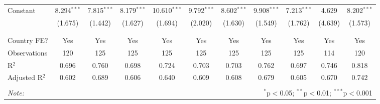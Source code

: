 \begin{table}[!htbp]
\begin{tabular}{@{\extracolsep{5pt}}lcccccccccc}
 Constant & 8.294$^{***}$ & 7.815$^{***}$ & 8.179$^{***}$ & 10.610$^{***}$ & 9.792$^{***}$ & 8.602$^{***}$ & 9.908$^{***}$ & 7.213$^{***}$ & 4.629 & 8.202$^{***}$ \\ 
  & (1.675) & (1.442) & (1.627) & (1.694) & (2.020) & (1.630) & (1.549) & (1.762) & (4.639) & (1.573) \\ 
  & & & & & & & & & & \\ 
\hline \\[-1.8ex] 
Country FE? & Yes & Yes & Yes & Yes & Yes & Yes & Yes & Yes & Yes & Yes \\ 
Observations & 120 & 125 & 125 & 125 & 125 & 125 & 125 & 125 & 114 & 120 \\ 
R$^{2}$ & 0.696 & 0.760 & 0.698 & 0.724 & 0.703 & 0.703 & 0.762 & 0.697 & 0.746 & 0.818 \\ 
Adjusted R$^{2}$ & 0.602 & 0.689 & 0.606 & 0.640 & 0.609 & 0.608 & 0.679 & 0.605 & 0.670 & 0.742 \\ 
\hline 
\hline \\[-1.8ex] 
\textit{Note:}  & \multicolumn{10}{r}{$^{*}$p$<$0.05; $^{**}$p$<$0.01; $^{***}$p$<$0.001} \\ 
\end{tabular} 
\end{table} 
